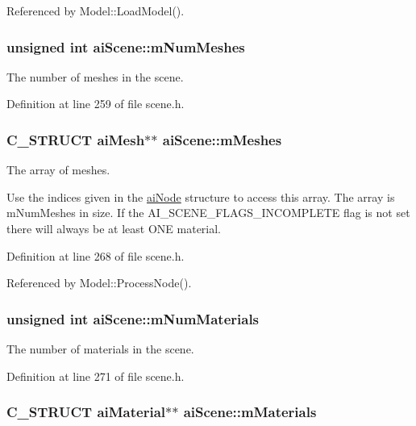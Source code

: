 Referenced by Model::LoadModel().\hypertarget{structai_scene_1a6c1abca994c54381a28cc151e5fa4f}{
\subsubsection[mNumMeshes]{\setlength{\rightskip}{0pt plus 5cm}unsigned int {\bf aiScene::mNumMeshes}}}
\label{structai_scene_1a6c1abca994c54381a28cc151e5fa4f}


The number of meshes in the scene. 

Definition at line 259 of file scene.h.\hypertarget{structai_scene_d1c7000f0f28ea747868db9f94d32a3d}{
\subsubsection[mMeshes]{\setlength{\rightskip}{0pt plus 5cm}C\_\-STRUCT {\bf aiMesh}$\ast$$\ast$ {\bf aiScene::mMeshes}}}
\label{structai_scene_d1c7000f0f28ea747868db9f94d32a3d}


The array of meshes.

Use the indices given in the \hyperlink{structai_node}{aiNode} structure to access this array. The array is mNumMeshes in size. If the AI\_\-SCENE\_\-FLAGS\_\-INCOMPLETE flag is not set there will always be at least ONE material. 

Definition at line 268 of file scene.h.

Referenced by Model::ProcessNode().\hypertarget{structai_scene_4277d8bffe8b8f568098af6c31d042b7}{
\subsubsection[mNumMaterials]{\setlength{\rightskip}{0pt plus 5cm}unsigned int {\bf aiScene::mNumMaterials}}}
\label{structai_scene_4277d8bffe8b8f568098af6c31d042b7}


The number of materials in the scene. 

Definition at line 271 of file scene.h.\hypertarget{structai_scene_52bc7089a5b943ad7c7c386e616df35e}{
\subsubsection[mMaterials]{\setlength{\rightskip}{0pt plus 5cm}C\_\-STRUCT {\bf aiMaterial}$\ast$$\ast$ {\bf aiScene::mMaterials}}}
\label{structai_scene_52bc7089a5b943ad7c7c386e616df35e}


